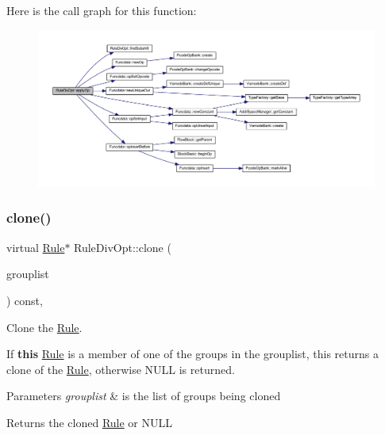 Here is the call graph for this function\+:
\nopagebreak
\begin{figure}[H]
\begin{center}
\leavevmode
\includegraphics[width=350pt]{class_rule_div_opt_a8443133b32d917f3b751ba1fa7dee8f1_cgraph}
\end{center}
\end{figure}
\mbox{\label{class_rule_div_opt_a4fb0c5c3f7dec93f20d65f1919693802}} 
\subsubsection{\texorpdfstring{clone()}{clone()}}
{\footnotesize\ttfamily virtual \mbox{\hyperlink{class_rule}{Rule}}$\ast$ Rule\+Div\+Opt\+::clone (\begin{DoxyParamCaption}\item[{const \mbox{\hyperlink{class_action_group_list}{Action\+Group\+List}} \&}]{grouplist }\end{DoxyParamCaption}) const\hspace{0.3cm}{\ttfamily [inline]}, {\ttfamily [virtual]}}



Clone the \mbox{\hyperlink{class_rule}{Rule}}. 

If {\bfseries{this}} \mbox{\hyperlink{class_rule}{Rule}} is a member of one of the groups in the grouplist, this returns a clone of the \mbox{\hyperlink{class_rule}{Rule}}, otherwise N\+U\+LL is returned. 
\begin{DoxyParams}{Parameters}
{\em grouplist} & is the list of groups being cloned \\
\hline
\end{DoxyParams}
\begin{DoxyReturn}{Returns}
the cloned \mbox{\hyperlink{class_rule}{Rule}} or N\+U\+LL 
\end{DoxyReturn}


